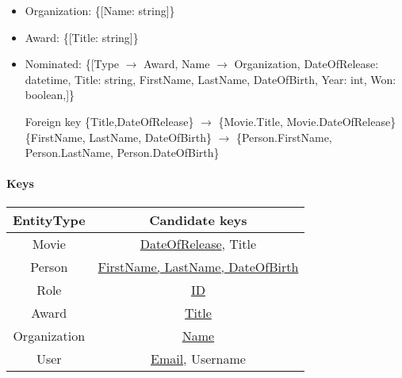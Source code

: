 \begin{itemize}
\item Organization: \{[Name: string]\}

\item Award: \{[Title: string]\}

\item Nominated: \{[Type $ \rightarrow $ Award, Name $ \rightarrow $ Organization, DateOfRelease: datetime, Title: string, FirstName, LastName, DateOfBirth, Year: int, Won: boolean,]\}

Foreign key \{Title,DateOfRelease\} $ \rightarrow $ \{Movie.Title, Movie.DateOfRelease\}
		\{FirstName, LastName, DateOfBirth\} $ \rightarrow $ \{Person.FirstName, Person.LastName, 
Person.DateOfBirth\}
\end{itemize}

\paragraph{Keys}

\begin{tabular}{| c | c |}
\hline
EntityType & Candidate keys\\
\hline 
\hline
Movie & \underline{DateOfRelease}, Title\\
\hline
Person & \underline{FirstName, LastName, DateOfBirth}\\
\hline
Role & \underline{ID}\\
\hline
\hline 
Award & \underline{Title}\\
\hline
Organization & \underline{Name}\\
\hline
User & \underline{Email}, Username\\
\hline
\end{tabular}

